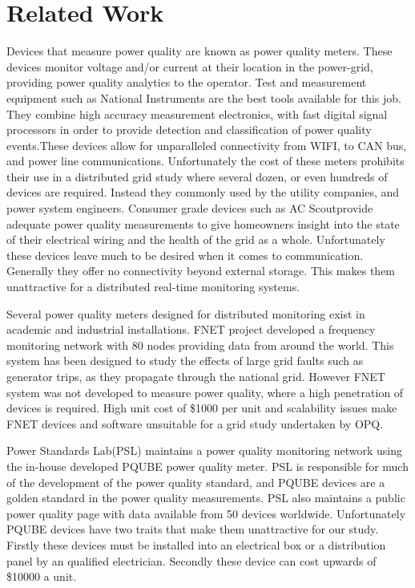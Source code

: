 \section{Related Work}

Devices that measure power quality are known as power quality meters. These devices monitor voltage and/or current at their location in the power-grid, providing power quality analytics to the operator. Test and measurement equipment such as National Instruments \cite{NI_Instrument} are the best tools available for this job. They combine high accuracy measurement electronics, with fast digital signal processors in order to provide detection and classification of power quality events.These devices allow for unparalleled connectivity from WIFI, to CAN bus, and power line communications. Unfortunately the cost of these meters prohibits their use in a distributed grid study where several dozen, or even hundreds of devices are required. Instead they commonly used by the utility companies, and power system engineers. Consumer grade devices such as AC Scout\textregistered provide adequate power quality measurements to give homeowners insight into the state of their electrical wiring and the health of the grid as a whole.\cite{ac_scout} Unfortunately these devices leave much to be desired when it comes to communication. Generally they offer no connectivity beyond external storage. This makes them unattractive for a distributed real-time monitoring systems.

Several power quality meters designed for distributed monitoring exist in academic and industrial installations. FNET project developed a frequency monitoring network with 80 nodes providing data from around the world.\cite{fnet_main} This system has been designed to study the effects of large grid faults such as generator trips, as they propagate through the national grid.\cite{fnet_2} However FNET system was not developed to measure power quality, where a high penetration of devices is required. High unit cost of \$1000 per unit and  scalability issues make FNET devices and software unsuitable for a grid study undertaken by OPQ.

Power Standards Lab(PSL) maintains a power quality monitoring network using the in-house developed PQUBE power quality meter.\cite{pqube} PSL is responsible for much of the development of the power quality standard, and PQUBE devices are a golden standard in the power quality measurements.  PSL also maintains a public power quality page with data available from 50 devices worldwide. Unfortunately PQUBE devices have two traits that make them unattractive for our study. Firstly these devices must be installed into an electrical box or a distribution panel by an qualified electrician. Secondly these device can cost upwards of \$10000 a unit.

